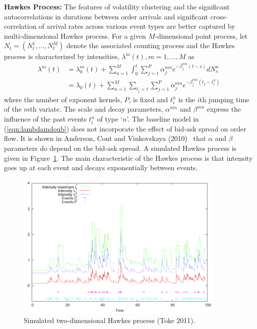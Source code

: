 \noindent\textbf{Hawkes Process:} The features of volatility clustering and the significant autocorrelations in durations between order arrivals and significant cross-correlation of arrival rates across various event types are better captured by multi-dimensional Hawkes process. For a given $M$-dimensional point process, let $N_t=(N_t^1,\ldots,N_t^M)$ denote the associated counting process and the Hawkes process is characterized by intensities, $\lambda^m(t), m=1,\ldots,M$ as
	\begin{equation}\label{eqn:lambdamdoub}
	\begin{split}
	\lambda^m(t)&= \lambda_0^m(t) + \sum_{n=1}^M \int_0^t \sum_{j=1}^P \alpha_j^{mn} e^{-\beta_j^{mn}(t-s)} dN_s^n \\
	&=\lambda_0(t) + \sum_{n=1}^M \sum_{t_j<t} \sum_{j=1}^P \alpha_j^{mn} e^{-\beta_j^{mn}(t_j -t_i^n)}
	\end{split}
	\end{equation}
where the number of exponent kernels, $P$, is fixed and $t_i^n$ is the $i$th jumping time of the $m$th variate. The scale and decay parameters, $\alpha^{mn}$ and $\beta^{mn}$ express the influence of the past events $t_i^n$ of type `$n$'. The baseline model in (\ref{eqn:lambdamdoub}) does not incorporate the effect of bid-ask spread on order flow. It is shown in Anderson, Cont and Vinkovskaya (2010)~\cite{} that $\alpha$ and $\beta$ parameters do depend on the bid-ask spread. A simulated Hawkes process is given in Figure~\ref{fig:hawkes}. The main characteristic of the Hawkes process is that intensity goes up at each event and decays exponentially between events. 
	\begin{figure}[!ht]
   	\centering
   	\includegraphics[width=0.9\textwidth]{chapters/chapter_el_exch/figures/hawkes.png} 
   	\caption{Simulated two-dimensional Hawkes process (Toke 2011). \label{fig:hawkes}}
	\end{figure}

